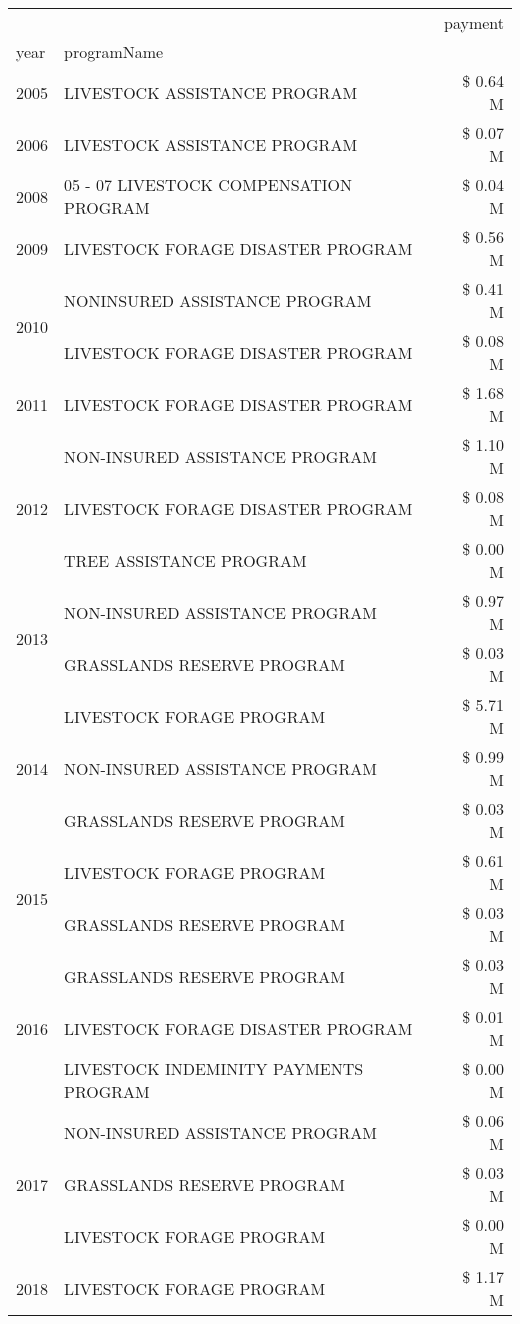 \begin{tabular}{llr}
\toprule
 &  & payment \\
year & programName &  \\
\midrule
2005 & LIVESTOCK ASSISTANCE PROGRAM & \$ 0.64 M \\
\cline{1-3}
2006 & LIVESTOCK ASSISTANCE PROGRAM & \$ 0.07 M \\
\cline{1-3}
2008 & 05 - 07 LIVESTOCK COMPENSATION PROGRAM & \$ 0.04 M \\
\cline{1-3}
2009 & LIVESTOCK FORAGE DISASTER  PROGRAM & \$ 0.56 M \\
\cline{1-3}
\multirow[t]{2}{*}{2010} & NONINSURED ASSISTANCE PROGRAM & \$ 0.41 M \\
 & LIVESTOCK FORAGE DISASTER PROGRAM & \$ 0.08 M \\
\cline{1-3}
2011 & LIVESTOCK FORAGE DISASTER PROGRAM & \$ 1.68 M \\
\cline{1-3}
\multirow[t]{3}{*}{2012} & NON-INSURED ASSISTANCE PROGRAM & \$ 1.10 M \\
 & LIVESTOCK FORAGE DISASTER PROGRAM & \$ 0.08 M \\
 & TREE ASSISTANCE PROGRAM & \$ 0.00 M \\
\cline{1-3}
\multirow[t]{2}{*}{2013} & NON-INSURED ASSISTANCE PROGRAM & \$ 0.97 M \\
 & GRASSLANDS RESERVE PROGRAM & \$ 0.03 M \\
\cline{1-3}
\multirow[t]{3}{*}{2014} & LIVESTOCK FORAGE PROGRAM & \$ 5.71 M \\
 & NON-INSURED ASSISTANCE PROGRAM & \$ 0.99 M \\
 & GRASSLANDS RESERVE PROGRAM & \$ 0.03 M \\
\cline{1-3}
\multirow[t]{2}{*}{2015} & LIVESTOCK FORAGE PROGRAM & \$ 0.61 M \\
 & GRASSLANDS RESERVE PROGRAM & \$ 0.03 M \\
\cline{1-3}
\multirow[t]{3}{*}{2016} & GRASSLANDS RESERVE PROGRAM & \$ 0.03 M \\
 & LIVESTOCK FORAGE DISASTER PROGRAM & \$ 0.01 M \\
 & LIVESTOCK INDEMINITY PAYMENTS PROGRAM & \$ 0.00 M \\
\cline{1-3}
\multirow[t]{3}{*}{2017} & NON-INSURED ASSISTANCE PROGRAM & \$ 0.06 M \\
 & GRASSLANDS RESERVE PROGRAM & \$ 0.03 M \\
 & LIVESTOCK FORAGE PROGRAM & \$ 0.00 M \\
\cline{1-3}
\multirow[t]{3}{*}{2018} & LIVESTOCK FORAGE PROGRAM & \$ 1.17 M \\

\end{tabular}
